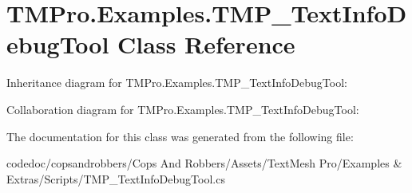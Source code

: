 \hypertarget{classTMPro_1_1Examples_1_1TMP__TextInfoDebugTool}{}\section{T\+M\+Pro.\+Examples.\+T\+M\+P\+\_\+\+Text\+Info\+Debug\+Tool Class Reference}
\label{classTMPro_1_1Examples_1_1TMP__TextInfoDebugTool}


Inheritance diagram for T\+M\+Pro.\+Examples.\+T\+M\+P\+\_\+\+Text\+Info\+Debug\+Tool\+:


Collaboration diagram for T\+M\+Pro.\+Examples.\+T\+M\+P\+\_\+\+Text\+Info\+Debug\+Tool\+:


The documentation for this class was generated from the following file\+:\begin{DoxyCompactItemize}
\item 
codedoc/copsandrobbers/\+Cops And Robbers/\+Assets/\+Text\+Mesh Pro/\+Examples \& Extras/\+Scripts/T\+M\+P\+\_\+\+Text\+Info\+Debug\+Tool.\+cs\end{DoxyCompactItemize}
